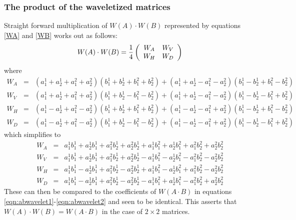 \subsubsection{The product of the waveletized matrices}

Straight forward multiplication of $W(A) \cdot W(B)$ represented by equations \ref{WA} and \ref{WB} works out as follows:
\[
W(A) \cdot W(B) = 
{1 \over 4} 
\left(
\begin{array}{cc}
W_A & W_V \\
W_H & W_D
\end{array}
\right)
\]
where
\begin{eqnarray*}
W_A &=& (a^1_1 + a^1_2 + a^2_1 + a^2_2)( b^1_1 + b^1_2 + b^2_1 + b^2_2) + ( a^1_1 + a^1_2 - a^2_1 - a^2_2)(b^1_1 - b^1_2 + b^2_1 - b^2_2) \\
W_V &=& ( a^1_1 + a^1_2 + a^2_1 + a^2_2) ( b^1_1 + b^1_2 - b^2_1 - b^2_2) + (a^1_1 + a^1_2 - a^2_1 - a^2_2) ( b^1_1 - b^1_2 - b^2_1 + b^2_2)  \\
W_H &=&  ( a^1_1 - a^1_2 + a^2_1 - a^2_2)(b^1_1 + b^1_2 + b^2_1 + b^2_2) +  ( a^1_1 - a^1_2 - a^2_1 + a^2_2 ) (b^1_1 - b^1_2 + b^2_1 - b^2_2) \\
W_D &=& ( a^1_1 - a^1_2 + a^2_1 - a^2_2) (b^1_1 + b^1_2 - b^2_1 - b^2_2)+( a^1_1 - a^1_2 - a^2_1 + a^2_2 )(b^1_1 - b^1_2 - b^2_1 + b^2_2)
\end{eqnarray*}
which simplifies to
\begin{eqnarray*}
W_A &=& a^1_1 b^1_1 + a^1_2 b^1_1 + a^2_1 b^1_2 + a^2_2 b^1_2 + a^1_1 b^2_1 + a^1_2 b^2_1 + a^2_1 b^2_2 + a^2_2 b^2_2 \\
W_V &=& a^1_1 b^1_1 + a^1_2 b^1_1 + a^2_1 b^1_2 + a^2_2 b^1_2 - a^1_1 b^2_1 - a^1_2 b^2_1 - a^2_1 b^2_2 - a^2_2 b^2_2 \\
W_H &=& a^1_1 b^1_1 - a^1_2 b^1_1 + a^2_1 b^1_2 - a^2_2 b^1_2 + a^1_1 b^2_1 - a^1_2 b^2_1 + a^2_1 b^2_2 - a^2_2 b^2_2 \\
W_D &=& a^1_1 b^1_1 - a^1_2 b^1_1 + a^2_1 b^1_2 - a^2_2 b^1_2 - a^1_1 b^2_1 + a^1_2 b^2_1 - a^2_1 b^2_2 + a^2_2 b^2_2 
\end{eqnarray*}
These can then be compared to the coefficients of $W(A \cdot B)$ in equations \ref{eqn:abwavelet1}-\ref{eqn:abwavelet2} and seen to be identical. This asserts that $W(A) \cdot W(B) = W(A \cdot B)$ in the case of $2 \times 2$ matrices.

